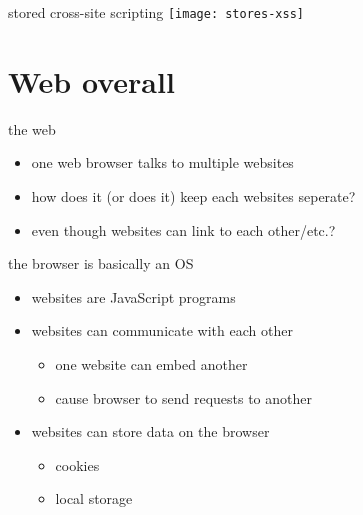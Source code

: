 \begin{frame}[fragile,label=storedXSS2]{stored cross-site scripting}
    \texttt{[image: stores-xss]}
\end{frame}

\section{Web overall}

\begin{frame}{the web}
\begin{itemize}
    \item one web browser talks to multiple websites
    \item how does it (or does it) keep each websites seperate?
    \item even though websites can link to each other/etc.?
\end{itemize}
\end{frame}

\begin{frame}{the browser is basically an OS}
    \begin{itemize}
    \item websites are JavaScript programs
    \item websites can communicate with each other
        \begin{itemize}
        \item one website can embed another
        \item cause browser to send requests to another
        \end{itemize}
    \item websites can store data on the browser
        \begin{itemize}
        \item cookies
        \item local storage
        \end{itemize}
    \end{itemize}
\end{frame}

